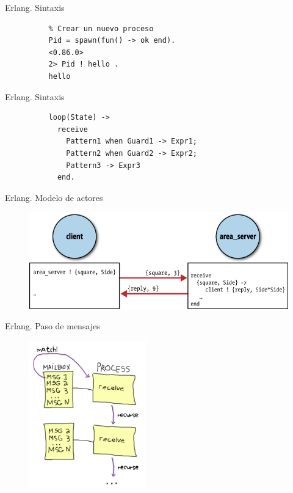 \documentclass{beamer}
\begin{document}
      \begin{frame}[fragile]{Erlang. Sintaxis}
        \begin{verbatim}
          % Crear un nuevo proceso
          Pid = spawn(fun() -> ok end).
          <0.86.0>
          2> Pid ! hello .
          hello
        \end{verbatim}
      \end{frame}

      \begin{frame}[fragile]{Erlang. Sintaxis}
        \begin{verbatim}
          loop(State) ->
            receive
              Pattern1 when Guard1 -> Expr1;
              Pattern2 when Guard2 -> Expr2;
              Pattern3 -> Expr3
            end.
        \end{verbatim}
      \end{frame}

      \begin{frame}{Erlang. Modelo de actores}
        \begin{figure}
          \includegraphics{actor-modelling.png}
        \end{figure}
      \end{frame}

      \begin{frame}{Erlang. Paso de mensajes}
        \begin{figure}
          \includegraphics[width=0.45\textwidth]{msg-match.png}
        \end{figure}
      \end{frame}
\end{document}
